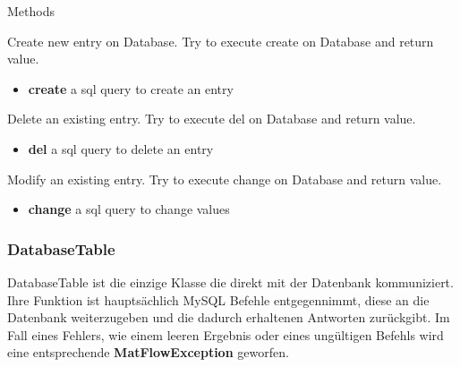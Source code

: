 \begin{methodenv}{Methods}
	
 Create new entry on Database. Try to execute create on Database and return value.

\begin{itemize}
	\item \textbf{create} 
	a sql query to create an entry
\end{itemize}

 Delete an existing entry. Try to execute del on Database and return value.

\begin{itemize}
	\item \textbf{del} 
	a sql query to delete an entry
\end{itemize}

 Modify an existing entry. Try to execute change on Database and return value.

\begin{itemize}
	\item \textbf{change} 
	a sql query to change values
\end{itemize}

\end{methodenv}

\subsubsection{DatabaseTable}
DatabaseTable ist die einzige Klasse die direkt mit der Datenbank kommuniziert. Ihre Funktion ist hauptsächlich MySQL Befehle entgegennimmt, diese an die Datenbank weiterzugeben und die dadurch erhaltenen Antworten zurückgibt. Im Fall eines Fehlers, wie einem leeren Ergebnis oder eines ungültigen Befehls wird eine entsprechende \textbf{MatFlowException} geworfen.

